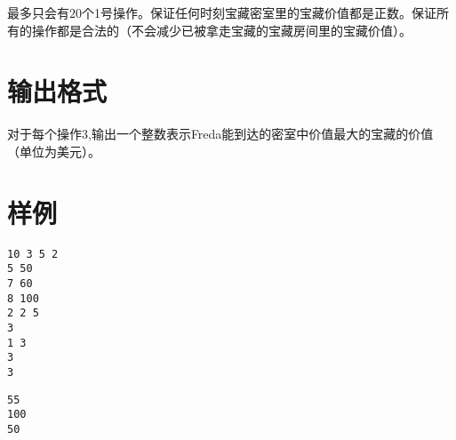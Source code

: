 \documentclass[11pt, a4paper]{article}
\begin{document}
最多只会有$20$个1号操作。保证任何时刻宝藏密室里的宝藏价值都是正数。保证所有的操作都是合法的（不会减少已被拿走宝藏的宝藏房间里的宝藏价值）。

\section*{输出格式}
对于每个操作3,输出一个整数表示Freda能到达的密室中价值最大的宝藏的价值（单位为美元）。

\section*{样例}
\begin{Verbatim}[frame=single, label=input]
10 3 5 2
5 50
7 60
8 100
2 2 5
3
1 3
3
3

\end{Verbatim}

\begin{Verbatim}[frame=single, label=output]
55
100
50

\end{Verbatim}
\end{document}
